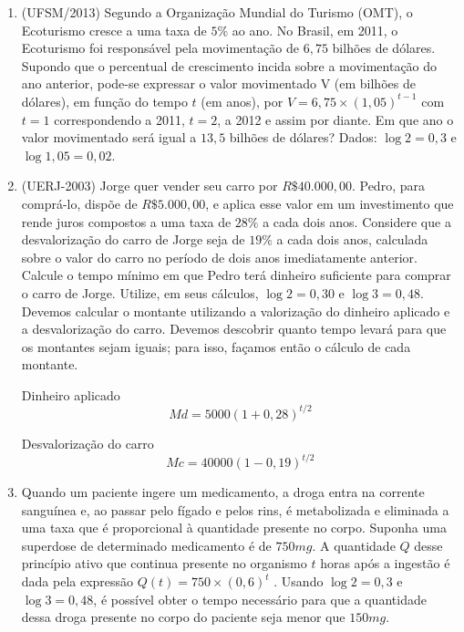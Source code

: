 \begin{enumerate}
\item {}\label{UFSM2013}

(UFSM/2013) Segundo a Organização Mundial do Turismo (OMT), o Ecoturismo cresce a uma taxa de $5\%$ ao ano. No Brasil, em 2011, o Ecoturismo foi responsável pela movimentação de $6{,}75$ bilhões de dólares. Supondo que o percentual de crescimento incida sobre a movimentação do ano anterior, pode-se expressar o valor movimentado V (em bilhões de dólares), em função do tempo $t$ (em anos), por $V = 6{,}75\times (1,05)^{t-1}$ com $t = 1$ correspondendo a 2011, $t = 2$, a 2012 e assim por diante. Em que ano o valor movimentado será igual a $13{,}5$ bilhões de dólares? Dados: $\log 2 = 0{,}3$ e $\log 1{,}05 = 0,02$.


\item{}\label{UERJ2003}

(UERJ-2003) Jorge quer vender seu carro por $R\$ 40.000{,}00$. Pedro, para comprá-lo, dispõe de $R\$ 5.000{,}00$, e aplica esse valor em um investimento que rende juros compostos a uma taxa de $28\%$ a cada dois anos. Considere que a desvalorização do carro de Jorge seja de $19\%$ a cada dois anos, calculada sobre o valor do carro no período de dois anos imediatamente anterior. Calcule o tempo mínimo em que Pedro terá dinheiro suficiente para comprar o carro de Jorge. Utilize, em seus cálculos, $\log 2 = 0{,}30$ e $\log 3 = 0{,}48$. Devemos calcular o montante utilizando a valorização do dinheiro aplicado e a desvalorização do carro. Devemos descobrir quanto tempo levará para que os montantes sejam iguais; para isso, façamos então o cálculo de cada montante.

Dinheiro aplicado
$$
Md=5000(1+0,28)^{t/2}
$$

Desvalorização do carro
$$
Mc=40000(1-0,19)^{t/2}
$$

\item{} \label{medicamento}

Quando um paciente ingere um medicamento, a droga entra na corrente sanguínea e, ao passar pelo fígado e pelos rins, é metabolizada e eliminada a uma taxa que é proporcional à quantidade presente no corpo. Suponha uma superdose de determinado medicamento é de $750 mg$. A quantidade $Q$ desse princípio ativo que continua presente no organismo $t$ horas após a ingestão é dada pela expressão $Q(t) = 750 \times (0,6)^t$ . Usando $\log 2 = 0{,}3$ e $\log 3 = 0{,}48$, é possível obter o tempo necessário para que a quantidade dessa droga presente no corpo do paciente seja menor que $150 mg$.


\end{enumerate}
